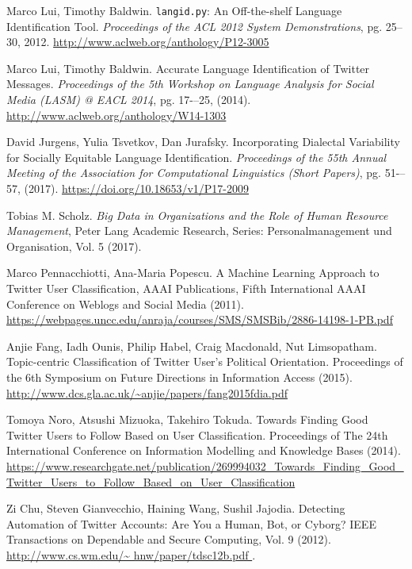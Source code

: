 \begin{thebibliography}{3}
 Marco Lui, Timothy Baldwin. {\tt langid.py}: An Off-the-shelf Language Identification Tool.
{\em Proceedings of the ACL 2012 System Demonstrations}, pg. 25--30, 2012.
\url{http://www.aclweb.org/anthology/P12-3005}

 Marco Lui, Timothy Baldwin. Accurate Language Identification of Twitter Messages. 
{\em Proceedings of the 5th Workshop on Language Analysis for Social Media (LASM) @ EACL 2014}, pg. 17-–25,
(2014). \url{http://www.aclweb.org/anthology/W14-1303}

 David Jurgens, Yulia Tsvetkov, Dan Jurafsky. Incorporating Dialectal Variability
for Socially Equitable Language Identification. 
{\em Proceedings of the 55th Annual Meeting of the Association for Computational Linguistics (Short Papers)}, 
pg. 51-–57, (2017). \url{https://doi.org/10.18653/v1/P17-2009}

 Tobias M. Scholz. {\em Big Data in Organizations and the Role of
Human Resource Management}, Peter Lang Academic Research, Series: Personalmanagement und
Organisation, Vol. 5 (2017).

Marco Pennacchiotti, Ana-Maria Popescu. A Machine Learning Approach to Twitter User 
Classification, AAAI Publications, Fifth International AAAI Conference on Weblogs and Social Media (2011).
\url{https://webpages.uncc.edu/anraja/courses/SMS/SMSBib/2886-14198-1-PB.pdf }

 Anjie Fang, Iadh Ounis, Philip Habel, Craig Macdonald, Nut Limsopatham.
Topic-centric Classification of Twitter User’s Political Orientation. Proceedings of the 
6th Symposium on Future Directions in Information Access (2015).
\url{http://www.dcs.gla.ac.uk/~anjie/papers/fang2015fdia.pdf }

 Tomoya Noro, Atsushi Mizuoka, Takehiro Tokuda. 
Towards Finding Good Twitter Users to Follow Based on User Classification.
Proceedings of The 24th International Conference on Information Modelling and Knowledge 
Bases (2014). \url{https://www.researchgate.net/publication/269994032_Towards_Finding_Good_Twitter_Users_to_Follow_Based_on_User_Classification }

 Zi Chu, Steven Gianvecchio, Haining Wang, Sushil Jajodia. 
Detecting Automation of Twitter Accounts: Are You a Human, Bot, or Cyborg?
IEEE Transactions on Dependable and Secure Computing, Vol. 9 (2012).
\url{http://www.cs.wm.edu/\~ hnw/paper/tdsc12b.pdf }.


\end{thebibliography}
